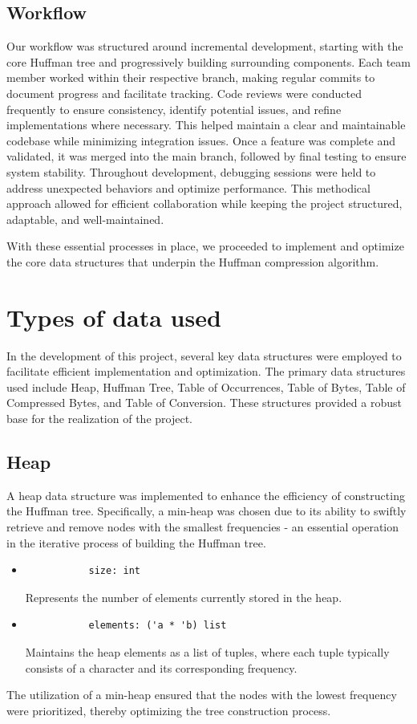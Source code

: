 \documentclass[12pt,oneside,letterpaper,english]{article}
\begin{document}
\subsection*{Workflow}
Our workflow was structured around incremental development, starting with the core Huffman tree and progressively building surrounding components. Each team member worked within their respective branch, making regular commits to document progress and facilitate tracking. Code reviews were conducted frequently to ensure consistency, identify potential issues, and refine implementations where necessary. This helped maintain a clear and maintainable codebase while minimizing integration issues. Once a feature was complete and validated, it was merged into the main branch, followed by final testing to ensure system stability. Throughout development, debugging sessions were held to address unexpected behaviors and optimize performance. This methodical approach allowed for efficient collaboration while keeping the project structured, adaptable, and well-maintained.


With these essential processes in place, we proceeded to implement and optimize the core data structures that underpin the Huffman compression algorithm.

\section{Types of data used}
In the development of this project, several key data structures were employed to facilitate efficient implementation and optimization. The primary data structures used include Heap, Huffman Tree, Table of Occurrences, Table of Bytes, Table of Compressed Bytes, and Table of Conversion. These structures provided a robust base for the realization of the project.

\subsection*{Heap}
A heap data structure was implemented to enhance the efficiency of constructing the Huffman tree. Specifically, a min-heap was chosen due to its ability to swiftly retrieve and remove nodes with the smallest frequencies - an essential operation in the iterative process of building the Huffman tree.
\begin{itemize}
    \item 
        \begin{verbatim}
           size: int 
        \end{verbatim}
        Represents the number of elements currently stored in the heap.
    \item 
        \begin{verbatim}
           elements: ('a * 'b) list 
        \end{verbatim}
        Maintains the heap elements as a list of tuples, where each tuple typically consists of a character and its corresponding frequency.
\end{itemize}
The utilization of a min-heap ensured that the nodes with the lowest frequency were prioritized, thereby optimizing the tree construction process.
\end{document}
